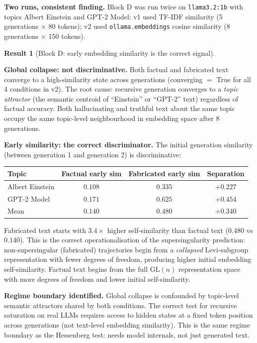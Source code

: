 \documentclass[11pt]{amsart}
\theoremstyle{definition}
\newtheorem{result}[theorem]{Result}
\begin{document}
\textbf{Two runs, consistent finding.}
Block D was run twice on \texttt{llama3.2:1b} with topics Albert Einstein
and GPT-2 Model:
v1 used TF-IDF similarity (5 generations $\times$ 80 tokens);
v2 used \texttt{ollama.embeddings} cosine similarity
(8 generations $\times$ 150 tokens).

\begin{result}[Block D: early embedding similarity is the correct signal]
\label{result:block-d}

\noindent\textbf{Global collapse: not discriminative.}
Both factual and fabricated text converge to a high-similarity state
across generations (converging $=$ True for all 4 conditions in v2).
The root cause: recursive generation converges to a \emph{topic attractor}
(the semantic centroid of ``Einstein'' or ``GPT-2'' text) regardless
of factual accuracy.
Both hallucinating and truthful text about the same topic occupy the
same topic-level neighbourhood in embedding space after 8 generations.

\noindent\textbf{Early similarity: the correct discriminator.}
The initial generation similarity (between generation 1 and generation 2)
is discriminative:

\begin{center}
\begin{tabular}{@{}lccc@{}}
\toprule
Topic & Factual early sim & Fabricated early sim & Separation \\
\midrule
Albert Einstein & $0.108$ & $0.335$ & $+0.227$ \\
GPT-2 Model & $0.171$ & $0.625$ & $+0.454$ \\
\midrule
Mean & $0.140$ & $0.480$ & $+0.340$ \\
\bottomrule
\end{tabular}
\end{center}

Fabricated text starts with $3.4\times$ higher self-similarity
than factual text ($0.480$ vs $0.140$).
This is the correct operationalisation of the supersingularity prediction:
non-supersingular (fabricated) trajectories begin from a
\emph{collapsed} Levi-subgroup representation with fewer degrees of freedom,
producing higher initial embedding self-similarity.
Factual text begins from the full $\mathrm{GL}(n)$ representation space
with more degrees of freedom and lower initial self-similarity.

\noindent\textbf{Regime boundary identified.}
Global collapse is confounded by topic-level semantic attractors
shared by both conditions.
The correct test for recursive saturation on real LLMs
requires access to hidden states at a fixed token position
across generations (not text-level embedding similarity).
This is the same regime boundary as the Hessenberg test:
needs model internals, not just generated text.


\end{result}
\end{document}
